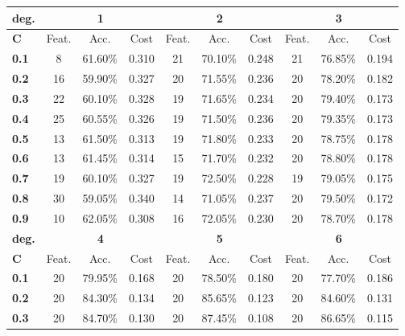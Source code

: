 \begin{table}[h]
    \centering
    \begin{tabular}{l | c c c|c c c|c c c}
        \toprule
        \multicolumn{1}{c}{\textbf{deg.}} & \multicolumn{3}{c}{\textbf{1}} & \multicolumn{3}{c}{\textbf{2}} & \multicolumn{3}{c}{\textbf{3}}\\
        \midrule
        \textbf{C}&Feat.&Acc.&Cost&Feat.&Acc.&Cost&Feat.&Acc.&Cost \\
        \midrule
        \textbf{0.1} &     8 & 61.60\% & 0.310 &    21 & 70.10\% & 0.248 &    21 & 76.85\% & 0.194\\
        \textbf{0.2} &    16 & 59.90\% & 0.327 &    20 & 71.55\% & 0.236 &    20 & 78.20\% & 0.182\\
        \textbf{0.3} &    22 & 60.10\% & 0.328 &    19 & 71.65\% & 0.234 &    20 & 79.40\% & 0.173\\
        \textbf{0.4} &    25 & 60.55\% & 0.326 &    19 & 71.50\% & 0.236 &    20 & 79.35\% & 0.173\\
        \textbf{0.5} &    13 & 61.50\% & 0.313 &    19 & 71.80\% & 0.233 &    20 & 78.75\% & 0.178\\
        \textbf{0.6} &    13 & 61.45\% & 0.314 &    15 & 71.70\% & 0.232 &    20 & 78.80\% & 0.178\\
        \textbf{0.7} &    19 & 60.10\% & 0.327 &    19 & 72.50\% & 0.228 &    19 & 79.05\% & 0.175\\
        \textbf{0.8} &    30 & 59.05\% & 0.340 &    14 & 71.05\% & 0.237 &    20 & 79.50\% & 0.172\\
        \textbf{0.9} &    10 & 62.05\% & 0.308 &    16 & 72.05\% & 0.230 &    20 & 78.70\% & 0.178\\
        \bottomrule
        \toprule
        \multicolumn{1}{c}{\textbf{deg.}} & \multicolumn{3}{c}{\textbf{4}} & \multicolumn{3}{c}{\textbf{5}} & \multicolumn{3}{c}{\textbf{6}}\\
        \midrule
        \textbf{C}&Feat.&Acc.&Cost&Feat.&Acc.&Cost&Feat.&Acc.&Cost \\
        \midrule
        \textbf{0.1} &    20 & 79.95\% & 0.168 &    20 & 78.50\% & 0.180 &    20 & 77.70\% & 0.186\\
        \textbf{0.2} &    20 & 84.30\% & 0.134 &    20 & 85.65\% & 0.123 &    20 & 84.60\% & 0.131\\
        \textbf{0.3} &    20 & 84.70\% & 0.130 &    20 & 87.45\% & 0.108 &    20 & 86.65\% & 0.115\\

\end{tabular}
\end{table}
